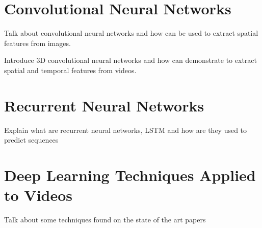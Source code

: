 \section{Convolutional Neural Networks}

Talk about convolutional neural networks and how can be used to extract spatial features from images.

Introduce 3D convolutional neural networks and how can demonstrate to extract spatial and temporal features from videos.

\section{Recurrent Neural Networks}

Explain what are recurrent neural networks, LSTM and how are they used to predict sequences

\section{Deep Learning Techniques Applied to Videos}

Talk about some techniques found on the state of the art papers

